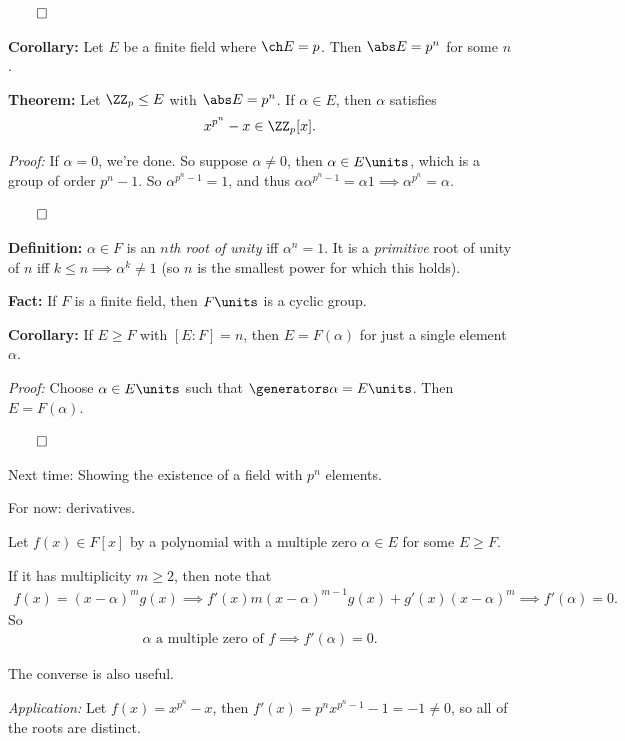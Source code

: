 \(\qed\)

\textbf{Corollary:} Let \(E\) be a finite field where \(\ch E = p\).
Then \(\abs E = p^n\) for some \(n\).

\textbf{Theorem:} Let \(\ZZ_p \leq E\) with \(\abs E = p^n\). If
\(\alpha \in E\), then \(\alpha\) satisfies
\begin{align*}
x^{p^n} - x \in \ZZ_p[x].
\end{align*}

\emph{Proof:} If \(\alpha = 0\), we're done. So suppose
\(\alpha \neq 0\), then \(\alpha \in E\units\), which is a group of
order \(p^n - 1\). So \(\alpha^{p^n - 1} = 1\), and thus
\(\alpha \alpha^{p^n - 1} = \alpha 1 \implies \alpha^{p^n} = \alpha\).

\(\qed\)

\textbf{Definition:} \(\alpha \in F\) is an \emph{\(n\)th root of unity}
iff \(\alpha^n = 1\). It is a \emph{primitive} root of unity of \(n\)
iff \(k\leq n \implies \alpha^k \neq 1\) (so \(n\) is the smallest power
for which this holds).

\textbf{Fact:} If \(F\) is a finite field, then \(F\units\) is a cyclic
group.

\textbf{Corollary:} If \(E \geq F\) with \([E: F] = n\), then
\(E = F(\alpha)\) for just a single element \(\alpha\).

\emph{Proof:} Choose \(\alpha \in E\units\) such that
\(\generators \alpha = E\units\). Then \(E = F(\alpha)\).

\(\qed\)

Next time: Showing the existence of a field with \(p^n\) elements.

For now: derivatives.

Let \(f(x) \in F[x]\) by a polynomial with a multiple zero
\(\alpha \in E\) for some \(E \geq F\).

If it has multiplicity \(m \geq 2\), then note that
\begin{align*}
f(x) = (x-\alpha)^m g(x) \implies f'(x) m(x-\alpha)^{m-1}g(x) + g'(x)(x-\alpha)^m \implies f'(\alpha) = 0.
\end{align*} So
\begin{align*}
\alpha \text{ a multiple zero of } f \implies f'(\alpha) = 0
.\end{align*}

The converse is also useful.

\emph{Application:} Let \(f(x) = x^{p^n} - x\), then
\(f'(x) = p^n x^{p^n - 1} - 1 = -1 \neq 0\), so all of the roots are
distinct.

